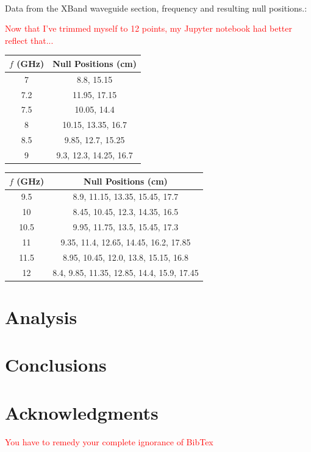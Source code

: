 \documentclass[12pt]{article}
\begin{document}
\


Data from the XBand waveguide section, frequency and resulting null positions.:

\textcolor{red}{Now that I've trimmed myself to 12 points, my Jupyter notebook had better reflect that...}

\begin{center}
 \begin{tabular}{||c c||} 
 \hline
 $f$ (GHz) & Null Positions (cm)\\ [0.5ex] 
 \hline
 7 & 8.8, 15.15 \\ 
 \hline
 7.2 & 11.95, 17.15 \\
 \hline
 7.5 & 10.05, 14.4 \\ 
 \hline
 8 & 10.15, 13.35, 16.7 \\
 \hline
 8.5 & 9.85, 12.7, 15.25 \\
 \hline 
 9 & 9.3, 12.3, 14.25, 16.7 \\ [1ex] 
 \hline
\end{tabular}
 \begin{tabular}{||c c||} 
 \hline
 $f$ (GHz) & Null Positions (cm)\\ [0.5ex] 
 \hline
 9.5 & 8.9, 11.15, 13.35, 15.45, 17.7 \\ 
 \hline
 10 & 8.45, 10.45, 12.3, 14.35, 16.5 \\
 \hline
 10.5 & 9.95, 11.75, 13.5, 15.45, 17.3 \\
 \hline
 11 & 9.35, 11.4, 12.65, 14.45, 16.2, 17.85 \\
 \hline
 11.5 & 8.95, 10.45, 12.0, 13.8, 15.15, 16.8 \\
 \hline
 12 & 8.4, 9.85, 11.35, 12.85, 14.4, 15.9, 17.45 \\ [1ex] 
 \hline
\end{tabular}
\end{center}

\section{Analysis}




\section{Conclusions}


\section{Acknowledgments}

\textcolor{red}{You have to remedy your complete ignorance of BibTex}
\end{document}
